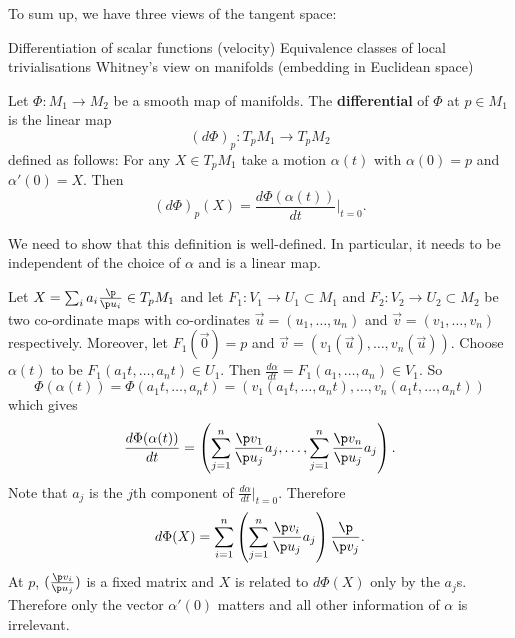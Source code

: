 \begin{rmk}[2.12]
  To sum up, we have three views of the tangent space:
  \begin{enum}
    \io Differentiation of scalar functions (velocity)
    \io Equivalence classes of local trivialisations
    \io Whitney's view on manifolds (embedding in Euclidean space)
  \end{enum}
\end{rmk}

\begin{defn}[2.13]
  Let $\Phi: M_1 \to M_2$ be a smooth map of manifolds.
  The \textbf{differential} of $\Phi$ at $p \in M_1$ is the linear map
  \[ (d\Phi)_p: T_pM_1 \to T_pM_2 \]
  defined as follows:
  For any $X \in T_pM_1$ take a motion $\alpha(t)$ with $\alpha(0)=p$ and $\alpha'(0)=X$.
  Then
  \[ (d\Phi)_p(X) = \frac{d\Phi(\alpha(t))}{dt}\Bigg\vert_{t=0}. \]
\end{defn}

We need to show that this definition is well-defined.
In particular, it needs to be independent of the choice of $\alpha$ and is a linear map.

Let $X = \sum_i a_i \tfrac{\p}{\p u_i} \in T_pM_1$ and let $F_1: V_1 \to U_1 \subset M_1$ and $F_2: V_2 \to U_2 \subset M_2$ be two co-ordinate maps with co-ordinates $\vec u=(u_1,\ldots,u_n)$ and $\vec v=(v_1,\ldots,v_n)$ respectively.
Moreover, let $F_1(\vec 0)=p$ and $\vec v = (v_1(\vec u),\ldots,v_n(\vec u))$.
Choose $\alpha(t)$ to be $F_1(a_1t,\ldots,a_nt) \in U_1$.
Then $\tfrac{d\alpha}{dt}=F_1(a_1,\ldots,a_n) \in V_1$.
So
\[ \Phi(\alpha(t)) = \Phi(a_1t,\ldots,a_nt) = (v_1(a_1t,\ldots,a_nt),\ldots,v_n(a_1t,\ldots,a_nt)) \]
which gives
\[ \frac{d\Phi(\alpha(t))}{dt} = \left( \sum_{j=1}^n \frac{\p v_1}{\p u_j}a_j, \ldots, \sum_{j=1}^n \frac{\p v_n}{\p u_j}a_j \right). \]
Note that $a_j$ is the $j$th component of $\tfrac{d\alpha}{dt}|_{t=0}$.
Therefore
\[ d\Phi(X) = \sum_{i=1}^n \left( \sum_{j=1}^n \frac{\p v_i}{\p u_j} a_j \right) \frac{\p}{\p v_j}. \]
At $p$, $(\tfrac{\p v_i}{\p u_j})$ is a fixed matrix and $X$ is related to $d\Phi(X)$ only by the $a_j$s.
Therefore only the vector $\alpha'(0)$ matters and all other information of $\alpha$ is irrelevant.

